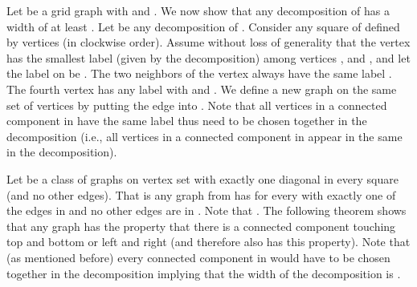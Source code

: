\documentclass[11pt]{article}
\begin{document}
Let  be a  grid graph with  and . We now show that any decomposition of  has a width of at least .  Let  be any decomposition of .  Consider any  square of  defined by vertices  (in clockwise order).  Assume without loss of generality that the vertex  has the smallest label (given by the decomposition) among vertices , and , and let the label on  be .  The two neighbors  of the vertex  always have the same label . The fourth vertex  has any label  with  and . We define a new graph  on the same set of vertices by putting the edge  into .  Note that all vertices in a connected component  in  have the same label thus need to be chosen together in the decomposition (i.e., all vertices in a connected component  in   appear in the same  in the decomposition). 

Let  be a class of graphs on vertex set  with exactly one diagonal in every  square (and no other edges). That is any graph  from  has for every  with  exactly one of the edges  in  and no other edges are in . Note that . The following theorem shows that any graph  has the property that there is a connected component touching top and bottom or left and right (and therefore  also has this property). Note that (as mentioned before) every connected component in  would have to be chosen together in the decomposition implying that the width of the decomposition is .
\end{document}
